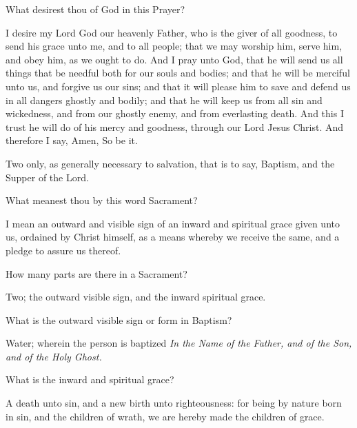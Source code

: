 \centerline{}

 What desirest thou of God in this Prayer?

 I desire my Lord God our heavenly Father, who is the giver of all goodness, to send his grace unto me, and to all people; that we may worship him, serve him, and obey him, as we ought to do. And I pray unto God, that he will send us all things that be needful both for our souls and bodies; and that he will be merciful unto us, and forgive us our sins; and that it will please him to save and defend us in all dangers ghostly and bodily; and that he will keep us from all sin and wickedness, and from our ghostly enemy, and from everlasting death. And this I trust he will do of his mercy and goodness, through our Lord Jesus Christ. And therefore I say, Amen, So be it.

\medskip
\centerline{}

 Two only, as generally necessary to salvation, that is to say, Baptism, and the Supper of the Lord.

 What meanest thou by this word Sacrament?

 I mean an outward and visible sign of an inward and spiritual grace given unto us, ordained by Christ himself, as a means whereby we receive the same, and a pledge to assure us thereof.

 How many parts are there in a Sacrament?

 Two; the outward visible sign, and the inward spiritual grace.

 What is the outward visible sign or form in Baptism?

 Water; wherein the person is baptized \emph{In the Name of the Father, and of the Son, and of the Holy Ghost.}

 What is the inward and spiritual grace?

 A death unto sin, and a new birth unto righteousness: for being by nature born in sin, and the children of wrath, we are hereby made the children of grace.

